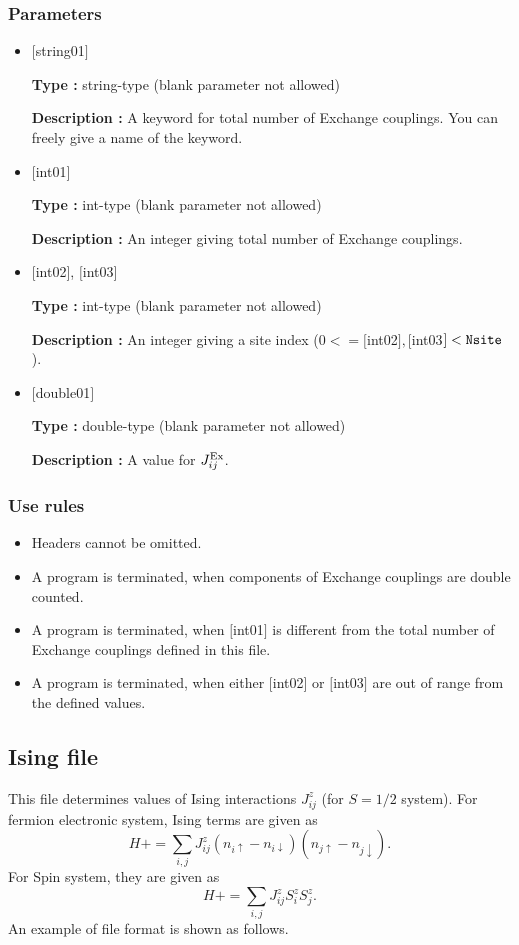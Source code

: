 \subsubsection{Parameters}
 \begin{itemize}

   \item  $[$string01$]$
   
    {\bf Type :} string-type (blank parameter not allowed)

   {\bf Description :}  A keyword for total number of Exchange couplings. You can freely give a name of the keyword.

   \item  $[$int01$]$
   
    {\bf Type :} int-type (blank parameter not allowed)

   {\bf Description :} An integer giving total number of Exchange couplings.

  \item  $[$int02$]$, $[$int03$]$
  
 {\bf Type :} int-type (blank parameter not allowed)

{\bf Description :} An integer giving a site index ($0<= [$int02$], [$int03$]<\verb|Nsite|$).
 
 \item  $[$double01$]$
   
   {\bf Type :} double-type (blank parameter not allowed)

  {\bf Description :}   A value for $J_{ij}^{\rm Ex}$.
  
\end{itemize}

\subsubsection{Use rules}
\begin{itemize}
\item Headers cannot be omitted. 
\item A program is terminated, when components of Exchange couplings are double counted.
\item A program is terminated, when $[$int01$]$ is different from the total number of Exchange couplings defined in this file.
\item A program is terminated, when either $[$int02$]$ or $[$int03$]$ are out of range from the defined values.
\end{itemize}


\newpage
\subsection{Ising file}
This file determines values of Ising interactions $J_{ij}^{z}$ {(for $S=1/2$ system)}.
For fermion electronic system, Ising terms are given as
\begin{equation}
H+=\sum_{i,j}J_{ij}^{z} (n_{i\uparrow}-n_{i\downarrow})(n_{j\uparrow}-n_{j\downarrow} ).
\end{equation}
For Spin system, they are given as
\begin{equation}
H+=\sum_{i,j}J_{ij}^{z} S_ {i}^{z}S_{j}^z.
\end{equation}
An example of file format is shown as follows.

